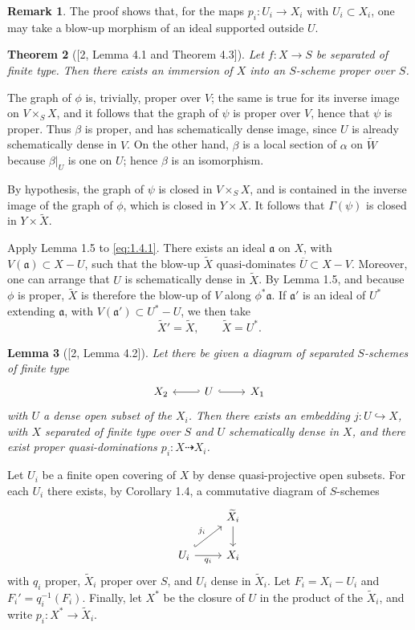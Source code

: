 \documentclass[11pt,a4paper]{article}
\theoremstyle{plain}
\newtheorem{theorem}{Theorem}
\newtheorem{lemma}[theorem]{Lemma}
\theoremstyle{definition}
\newtheorem{remark}[theorem]{Remark}
\begin{document}
\begin{remark}
The proof shows that, for the maps $p_i:U_i\to X_i$ with $U_i\subset X_i$, one may take a blow-up morphism of an ideal supported outside $U$.
\end{remark}

\begin{theorem}[{[2, Lemma 4.1 and Theorem 4.3]}]
Let $f:X\to S$ be separated of finite type. Then there exists an immersion of $X$ into an $S$-scheme proper over $S$.
\end{theorem}

The graph of $\phi$ is, trivially, proper over $V$; the same is true for its inverse image on $V\times_S X$, and it follows that the graph of $\psi$ is proper over $V$, hence that $\psi$ is proper. Thus $\beta$ is proper, and has schematically dense image, since $U$ is already schematically dense in $V$. On the other hand, $\beta$ is a local section of $\alpha$ on $\widetilde W$ because $\beta|_U$ is one on $U$; hence $\beta$ is an isomorphism.

By hypothesis, the graph of $\psi$ is closed in $V\times_S X$, and is contained in the inverse image of the graph of $\phi$, which is closed in $Y\times X$. It follows that $\Gamma(\psi)$ is closed in $Y\times\widetilde X$.

Apply Lemma 1.5 to \eqref{eq:1.4.1}. There exists an ideal $\mathfrak a$ on $X$, with $V(\mathfrak a)\subset X-U$, such that the blow-up $\widetilde X$ quasi-dominates $\overline U\subset X-V$. Moreover, one can arrange that $U$ is schematically dense in $\widetilde X$. By Lemma 1.5, and because $\phi$ is proper, $\widetilde X$ is therefore the blow-up of $V$ along $\phi^*\mathfrak a$. If $\mathfrak a'$ is an ideal of $U^*$ extending $\mathfrak a$, with $V(\mathfrak a')\subset U^*-U$, we then take
\[
\widetilde X'=\widetilde X,\qquad \widetilde X=U^*.
\]

\begin{lemma}[{[2, Lemma 4.2]}]
Let there be given a diagram of separated $S$-schemes of finite type
\[
\begin{tikzcd}
X_2 & U \arrow[l,hook'] \arrow[r,hook] & X_1
\end{tikzcd}
\]
with $U$ a dense open subset of the $X_i$. Then there exists an embedding $j:U\hookrightarrow X$, with $X$ separated of finite type over $S$ and $U$ schematically dense in $X$, and there exist proper quasi-dominations $p_i:X\dashrightarrow X_i$.
\end{lemma}

Let $U_i$ be a finite open covering of $X$ by dense quasi-projective open subsets. For each $U_i$ there exists, by Corollary 1.4, a commutative diagram of $S$-schemes
\[
\begin{tikzcd}
& \widetilde X_i \arrow[d] \\
U_i \arrow[ur,hook,"j_i"] \arrow[r,"q_i"'] & X_i
\end{tikzcd}
\]
with $q_i$ proper, $\widetilde X_i$ proper over $S$, and $U_i$ dense in $\widetilde X_i$. Let $F_i=X_i-U_i$ and $F_i'=q_i^{-1}(F_i)$. Finally, let $X^*$ be the closure of $U$ in the product of the $\widetilde X_i$, and write $p_i:X^*\to\widetilde X_i$.
\end{document}
